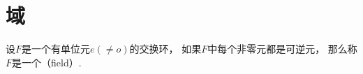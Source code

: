 
\section{域}
\begin{definition}
设\(F\)是一个有单位元\(e(\neq o)\)的交换环，
如果\(F\)中每个非零元都是可逆元，
那么称\(F\)是一个（field）.
\end{definition}

%
%
%
%

